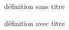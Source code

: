 \begin{definition}
définition sans titre
\end{definition}

\begin{definition}[Un titre]
définition avec titre
\end{definition}